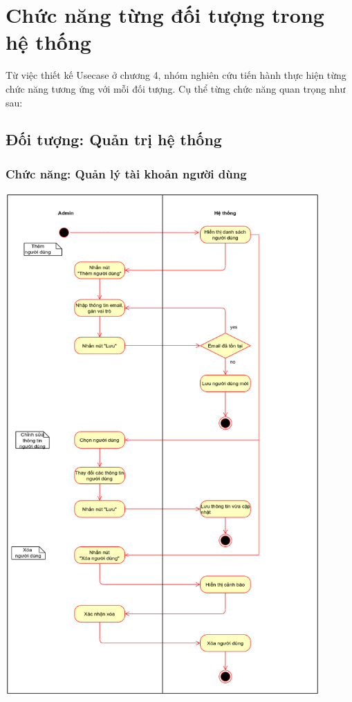 \section{Chức năng từng đối tượng trong hệ thống}
Từ việc thiết kế Usecase ở chương 4, nhóm nghiên cứu tiến hành thực hiện từng chức năng tương ứng với mỗi đối tượng. Cụ thể từng chức năng quan trọng như sau:
\subsection{Đối tượng: Quản trị hệ thống}
\subsubsection{Chức năng: Quản lý tài khoản người dùng}
 \begin{center}
  \captionsetup{type=figure}
  \includegraphics[width=12cm]{img/UML/Admin/UserMgt.png}
\end{center}
